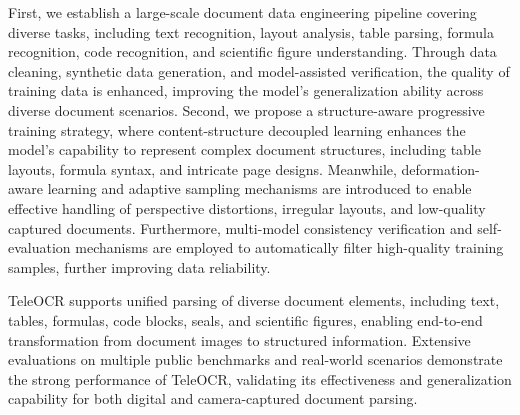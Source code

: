 \documentclass{fairmeta}
\begin{document}
First, we establish a large-scale document data engineering pipeline covering diverse tasks, including text recognition, layout analysis, table parsing, formula recognition, code recognition, and scientific figure understanding. Through data cleaning, synthetic data generation, and model-assisted verification, the quality of training data is enhanced, improving the model's generalization ability across diverse document scenarios. Second, we propose a structure-aware progressive training strategy, where content-structure decoupled learning enhances the model's capability to represent complex document structures, including table layouts, formula syntax, and intricate page designs. Meanwhile, deformation-aware learning and adaptive sampling mechanisms are introduced to enable effective handling of perspective distortions, irregular layouts, and low-quality captured documents. Furthermore, multi-model consistency verification and self-evaluation mechanisms are employed to automatically filter high-quality training samples, further improving data reliability.

TeleOCR supports unified parsing of diverse document elements, including text, tables, formulas, code blocks, seals, and scientific figures, enabling end-to-end transformation from document images to structured information. Extensive evaluations on multiple public benchmarks and real-world scenarios demonstrate the strong performance of TeleOCR, validating its effectiveness and generalization capability for both digital and camera-captured document parsing.




\newpage
\beginappendix
\end{document}
